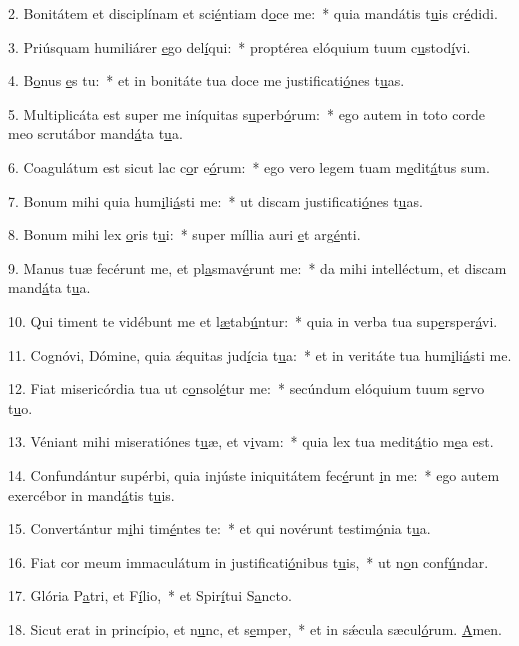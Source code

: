 2. Bonitátem et disciplínam et sci\uline{é}ntiam d\uline{o}ce me:~* quia mandátis t\uline{u}is cr\uline{é}didi.\par 
3. Priúsquam humiliárer \uline{e}go del\uline{í}qui:~* proptérea elóquium tuum c\uline{u}stod\uline{í}vi.\par 
4. B\uline{o}nus \uline{e}s tu:~* et in bonitáte tua doce me justificati\uline{ó}nes t\uline{u}as.\par 
5. Multiplicáta est super me iníquitas s\uline{u}perb\uline{ó}rum:~* ego autem in toto corde meo scrutábor mand\uline{á}ta t\uline{u}a.\par 
6. Coagulátum est sicut lac c\uline{o}r e\uline{ó}rum:~* ego vero legem tuam m\uline{e}dit\uline{á}tus sum.\par 
7. Bonum mihi quia hum\uline{i}li\uline{á}sti me:~* ut discam justificati\uline{ó}nes t\uline{u}as.\par 
8. Bonum mihi lex \uline{o}ris t\uline{u}i:~* super míllia auri \uline{e}t arg\uline{é}nti.\par 
9. Manus tuæ fecérunt me, et pl\uline{a}smav\uline{é}runt me:~* da mihi intelléctum, et discam mand\uline{á}ta t\uline{u}a.\par 
10. Qui timent te vidébunt me et l\uline{æ}tab\uline{ú}ntur:~* quia in verba tua sup\uline{e}rsper\uline{á}vi.\par 
11. Cognóvi, Dómine, quia ǽquitas jud\uline{í}cia t\uline{u}a:~* et in veritáte tua hum\uline{i}li\uline{á}sti me.\par 
12. Fiat misericórdia tua ut c\uline{o}nsol\uline{é}tur me:~* secúndum elóquium tuum s\uline{e}rvo t\uline{u}o.\par 
13. Véniant mihi miseratiónes t\uline{u}æ, et v\uline{i}vam:~* quia lex tua medit\uline{á}tio m\uline{e}a est.\par 
14. Confundántur supérbi, quia injúste iniquitátem fec\uline{é}runt \uline{i}n me:~* ego autem exercébor in mand\uline{á}tis t\uline{u}is.\par 
15. Convertántur m\uline{i}hi tim\uline{é}ntes te:~* et qui novérunt testim\uline{ó}nia t\uline{u}a.\par 
16. Fiat cor meum immaculátum in justificati\uline{ó}nibus t\uline{u}is,~* ut n\uline{o}n conf\uline{ú}ndar.\par 
17. Glória P\uline{a}tri, et F\uline{í}lio,~* et Spir\uline{í}tui S\uline{a}ncto.\par 
18. Sicut erat in princípio, et n\uline{u}nc, et s\uline{e}mper,~* et in sǽcula sæcul\uline{ó}rum. \uline{A}men.\par 
